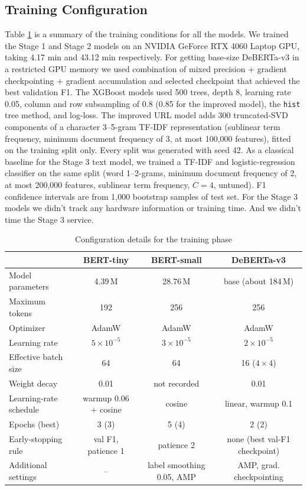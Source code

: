 \documentclass[conference]{IEEEtran}
\begin{document}
\subsection{Training Configuration}
Table \ref{tab:hparams} is a summary of the training conditions for all the models. We trained the Stage 1 and Stage 2 models on an NVIDIA GeForce RTX 4060 Laptop GPU, taking 4.17 min and 43.12 min respectively. For getting base-size DeBERTa-v3 in a restricted GPU memory we used combination of mixed precision + gradient checkpointing + gradient accumulation and selected checkpoint that achieved the best validation F1. The XGBoost models used 500 trees, depth 8, learning rate 0.05, column and row subsampling of 0.8 (0.85 for the improved model), the \texttt{hist} tree method, and log-loss. The improved URL model adds 300 truncated-SVD components of a character 3--5-gram TF-IDF representation (sublinear term frequency, minimum document frequency of 3, at most 100,000 features), fitted on the training split only. Every split was generated with seed 42. As a classical baseline for the Stage 3 text model, we trained a TF-IDF and logistic-regression classifier on the same split (word 1--2-grams, minimum document frequency of 2, at most 200,000 features, sublinear term frequency, $C = 4$, untuned). F1 confidence intervals are from 1,000 bootstrap samples of test set. For the Stage 3 models we didn't track any hardware information or training time. And we didn't time the Stage 3 service.

\begin{table}[t]
\centering
\caption{Configuration details for the training phase}
\label{tab:hparams}
\begin{tabular}{lccc}
\toprule
 & BERT-tiny & BERT-small & DeBERTa-v3 \\
\midrule
Model parameters & 4.39\,M & 28.76\,M & base (about 184\,M) \\
Maximum tokens & 192 & 256 & 256 \\
Optimizer & AdamW & AdamW & AdamW \\
Learning rate & $5\times10^{-5}$ & $3\times10^{-5}$ & $2\times10^{-5}$ \\
Effective batch size & 64 & 64 & 16 ($4\times4$) \\
Weight decay & 0.01 & not recorded & 0.01 \\
Learning-rate schedule & warmup 0.06 + cosine & cosine & linear, warmup 0.1 \\
Epochs (best) & 3 (3) & 5 (4) & 2 (2) \\
Early-stopping rule & val F1, patience 1 & patience 2 & none (best val-F1 checkpoint) \\
Additional settings & -- & label smoothing 0.05, AMP & AMP, grad. checkpointing \\
\bottomrule
\end{tabular}
\end{table}
\end{document}

